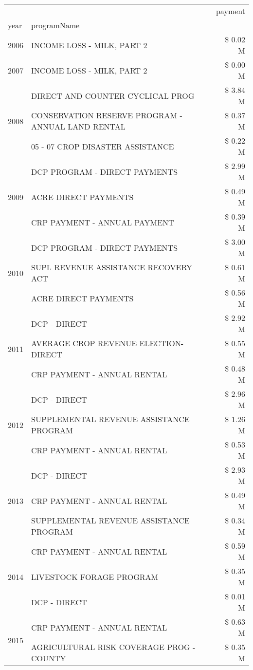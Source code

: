 \begin{tabular}{llr}
\toprule
 &  & payment \\
year & programName &  \\
\midrule
2006 & INCOME LOSS - MILK, PART 2 & \$ 0.02 M \\
\cline{1-3}
2007 & INCOME LOSS - MILK, PART 2 & \$ 0.00 M \\
\cline{1-3}
\multirow[t]{3}{*}{2008} & DIRECT AND COUNTER CYCLICAL PROG & \$ 3.84 M \\
 & CONSERVATION RESERVE PROGRAM - ANNUAL LAND RENTAL & \$ 0.37 M \\
 & 05 - 07 CROP DISASTER ASSISTANCE & \$ 0.22 M \\
\cline{1-3}
\multirow[t]{3}{*}{2009} & DCP PROGRAM - DIRECT PAYMENTS & \$ 2.99 M \\
 & ACRE DIRECT PAYMENTS & \$ 0.49 M \\
 & CRP PAYMENT - ANNUAL PAYMENT & \$ 0.39 M \\
\cline{1-3}
\multirow[t]{3}{*}{2010} & DCP PROGRAM - DIRECT PAYMENTS & \$ 3.00 M \\
 & SUPL REVENUE ASSISTANCE RECOVERY ACT & \$ 0.61 M \\
 & ACRE DIRECT PAYMENTS & \$ 0.56 M \\
\cline{1-3}
\multirow[t]{3}{*}{2011} & DCP - DIRECT & \$ 2.92 M \\
 & AVERAGE CROP REVENUE ELECTION-DIRECT & \$ 0.55 M \\
 & CRP PAYMENT - ANNUAL RENTAL & \$ 0.48 M \\
\cline{1-3}
\multirow[t]{3}{*}{2012} & DCP - DIRECT & \$ 2.96 M \\
 & SUPPLEMENTAL REVENUE ASSISTANCE PROGRAM & \$ 1.26 M \\
 & CRP PAYMENT - ANNUAL RENTAL & \$ 0.53 M \\
\cline{1-3}
\multirow[t]{3}{*}{2013} & DCP - DIRECT & \$ 2.93 M \\
 & CRP PAYMENT - ANNUAL RENTAL & \$ 0.49 M \\
 & SUPPLEMENTAL REVENUE ASSISTANCE PROGRAM & \$ 0.34 M \\
\cline{1-3}
\multirow[t]{3}{*}{2014} & CRP PAYMENT - ANNUAL RENTAL & \$ 0.59 M \\
 & LIVESTOCK FORAGE PROGRAM & \$ 0.35 M \\
 & DCP - DIRECT & \$ 0.01 M \\
\cline{1-3}
\multirow[t]{3}{*}{2015} & CRP PAYMENT - ANNUAL RENTAL & \$ 0.63 M \\
 & AGRICULTURAL RISK COVERAGE PROG - COUNTY & \$ 0.35 M \\

\end{tabular}
